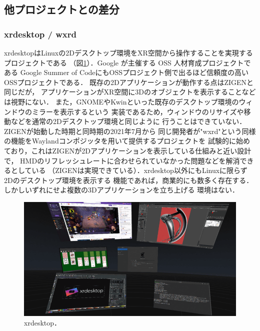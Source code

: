 \subsection{他プロジェクトとの差分}

\subsubsection{xrdesktop / wxrd}

xrdesktopはLinuxの2Dデスクトップ環境をXR空間から操作することを実現するプロジェクトである
（図\ref{fig:xrdesktop}）．Google が主催する OSS 人材育成プロジェクトである
Google Summer of CodeにもOSSプロジェクト側で出るほど信頼度の高いOSSプロジェクトである．
既存の2Dアプリケーションが動作する点はZIGENと同じだが，
アプリケーションがXR空間に3Dのオブジェクトを表示することなどは視野にない．
また，GNOMEやKwinといった既存のデスクトップ環境のウィンドウのミラーを表示するという
実装であるため，ウィンドウのリサイズや移動などを通常の2Dデスクトップ環境と同じように
行うことはできていない．ZIGENが始動した時期と同時期の2021年7月から
同じ開発者が"wxrd"という同様の機能をWaylandコンポジッタを用いて提供するプロジェクトを
試験的に始めており，これはZIGENが2Dアプリケーションを表示している仕組みと近い設計で，
HMDのリフレッシュレートに合わせられていなかった問題などを解消できるとしている
（ZIGENは実現できている）．xrdesktop以外にもLinuxに限らず2Dのデスクトップ環境を表示する
機能であれば，商業的にも数多く存在する．しかしいずれにせよ複数の3Dアプリケーションを立ち上げる
環境はない．

\begin{figure}[htbp]
  \begin{minipage}[t]{0.50\linewidth}
    \centering
    \includegraphics[keepaspectratio, width=\linewidth]{fig/xrdesktop.png}
    \caption{xrdesktop．}
    \label{fig:xrdesktop}
  \end{minipage}
\end{figure}

